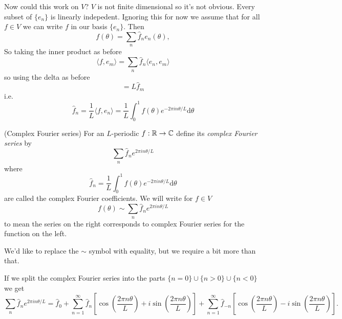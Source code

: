 \documentclass{article}
\begin{document}
Now could this work on $ V $? $ V $ is not finite dimensional so it's not obvious. Every subset of $ \{e_n\} $ is linearly indepedent. Ignoring this for now we assume that for all $ f\in V $ we can write $ f $ in our basis $ \{e_n\} $. Then
\[
  f(\theta)=\sum_n\hat f_ne_n(\theta),
\]
So taking the inner product as before
\[
  \langle f,e_m\rangle = \sum_n\hat f_n\langle e_n,e_m\rangle
\]
so using the delta as before
\[
  =L\hat f_m
\]
i.e.
\[
	\hat f_n=\frac{1}{L}\langle f, e_n\rangle = \frac{1}{L} \int_0^1 f(\theta)e^{-2\pi in\theta/L}\mathrm d\theta
\]
\begin{definition}
	(Complex Fourier series) For an $ L $-periodic $ f:\mathbb{R}\to \mathbb{C} $ define its \textit{complex Fourier series} by
	\[
		\sum_n\hat f_n e^{2\pi in \theta /L}
	\]
	where
	\[
		\hat f_n = \frac 1L \int_0^1 f(\theta) e^{-2\pi in\theta/L}\mathrm d \theta
	\]
	are called the complex Fourier coefficients. We will write for $ f\in V $
	\[
		f(\theta)\sim \sum_n\hat f_n e^{2\pi in\theta/L}
	\]
	to mean the series on the right corresponds to complex Fourier series for the function on the left.
\end{definition}
We'd like to replace the $ \sim $ symbol with equality, but we require a bit more than that.\par
If we split the complex Fourier series into the parts $\{n=0\}\cup\{n>0\}\cup\{n<0\}$ we get
\[
\sum_n\hat f_n e^{2\pi i n\theta / L} = \hat f_0 + \sum_{n=1}^\infty \hat f_n\left[\cos\left(\frac{2\pi n\theta}{L}\right)+i\sin\left(\frac{2\pi n\theta}{L}\right)\right]
+
\sum_{n=1}^\infty \hat f_{-n}\left[\cos\left(\frac{2\pi n\theta}{L}\right)-i\sin\left(\frac{2\pi n\theta}{L}\right)\right].
\]
\end{document}
